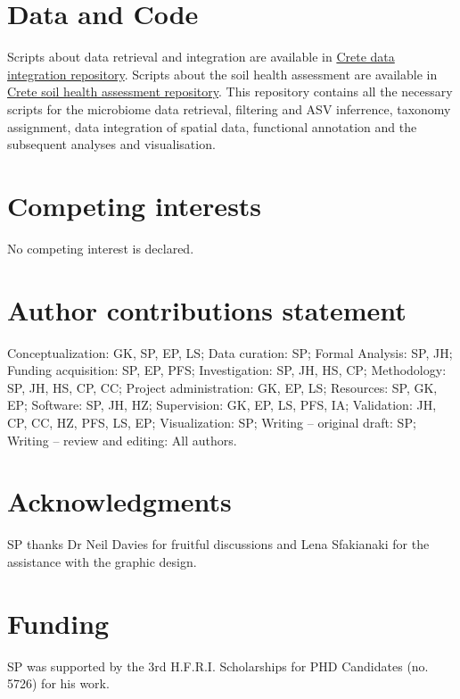 \documentclass[a4paper,12pt]{article}
\begin{document}
\section{Data and Code}
Scripts about data retrieval and integration are available in
\href{https://github.com/savvas-paragkamian/crete-idea.git}{Crete data integration repository}.
Scripts about the soil health assessment are available in 
\href{https://github.com/savvas-paragkamian/crete-soil-health.git}{Crete soil health assessment repository}.
This repository contains all the necessary scripts for the microbiome data retrieval,
filtering and ASV inferrence, taxonomy assignment, data integration of spatial data, 
functional annotation and the subsequent analyses and visualisation.

\section{Competing interests}
No competing interest is declared.

\section{Author contributions statement}
Conceptualization: GK, SP, EP, LS;
Data curation: SP;
Formal Analysis: SP, JH;
Funding acquisition: SP, EP, PFS;
Investigation: SP, JH, HS, CP;
Methodology: SP, JH, HS, CP, CC;
Project administration: GK, EP, LS;
Resources: SP, GK, EP;
Software: SP, JH, HZ;
Supervision: GK, EP, LS, PFS, IA;
Validation: JH, CP, CC, HZ, PFS, LS, EP;
Visualization: SP;
Writing – original draft: SP;
Writing – review and editing: All authors.

\section{Acknowledgments}
SP thanks Dr Neil Davies for fruitful discussions and Lena Sfakianaki for the assistance with the graphic design.

\section{Funding}
SP was supported by the 3rd H.F.R.I. Scholarships for PHD Candidates (no. 5726) for his work.

\printbibliography[heading=bibintoc]
\end{document}
